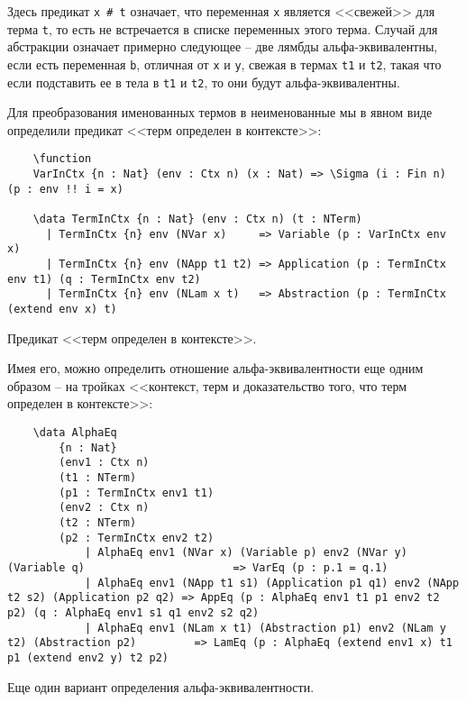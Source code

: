 Здесь предикат \texttt{x # t} означает, что переменная \texttt{x} является <<свежей>> для терма \texttt{t}, то есть не встречается в списке переменных этого терма. Случай для абстракции означает примерно следующее -- две лямбды альфа-эквивалентны, если есть переменная \texttt{b}, отличная от \texttt{x} и \texttt{y}, свежая в термах \texttt{t1} и \texttt{t2}, такая что если подставить ее в тела в \texttt{t1} и \texttt{t2}, то они будут альфа-эквивалентны.

Для преобразования именованных термов в неименованные мы в явном виде определили предикат <<терм определен в контексте>>:

\begin{listing}[H]
  \begin{verbatim}
    \function
    VarInCtx {n : Nat} (env : Ctx n) (x : Nat) => \Sigma (i : Fin n) (p : env !! i = x)

    \data TermInCtx {n : Nat} (env : Ctx n) (t : NTerm)
      | TermInCtx {n} env (NVar x)     => Variable (p : VarInCtx env x)
      | TermInCtx {n} env (NApp t1 t2) => Application (p : TermInCtx env t1) (q : TermInCtx env t2)
      | TermInCtx {n} env (NLam x t)   => Abstraction (p : TermInCtx (extend env x) t)
  \end{verbatim}
  \caption{Предикат <<терм определен в контексте>>.}
\end{listing}

Имея его, можно определить отношение альфа-эквивалентности еще одним образом -- на тройках <<контекст, терм и доказательство того, что терм определен в контексте>>:

\begin{listing}[H]
  \begin{verbatim}
    \data AlphaEq
        {n : Nat}
        (env1 : Ctx n)
        (t1 : NTerm)
        (p1 : TermInCtx env1 t1)
        (env2 : Ctx n)
        (t2 : NTerm)
        (p2 : TermInCtx env2 t2)
            | AlphaEq env1 (NVar x) (Variable p) env2 (NVar y) (Variable q)                       => VarEq (p : p.1 = q.1)
            | AlphaEq env1 (NApp t1 s1) (Application p1 q1) env2 (NApp t2 s2) (Application p2 q2) => AppEq (p : AlphaEq env1 t1 p1 env2 t2 p2) (q : AlphaEq env1 s1 q1 env2 s2 q2)
            | AlphaEq env1 (NLam x t1) (Abstraction p1) env2 (NLam y t2) (Abstraction p2)         => LamEq (p : AlphaEq (extend env1 x) t1 p1 (extend env2 y) t2 p2)
  \end{verbatim}
  \caption{Еще один вариант определения альфа-эквивалентности.}
\end{listing}

